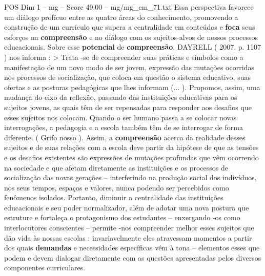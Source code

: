 \begin{textsample}{POS Dim 1 – mg – Score 49.00 – mg/mg\_em\_71.txt}
Essa perspectiva favorece um diálogo profícuo entre as quatro áreas do conhecimento, promovendo a construção de um currículo que supera a centralidade em conteúdos e \textbf{foca} seus esforços na \textbf{compreensão} e no diálogo com os sujeitos-alvos de nossos processos educacionais.
Sobre esse \textbf{potencial} de \textbf{compreensão}, DAYRELL ( 2007, p. 1107 ) nos informa : > Trata -se de compreender suas práticas e símbolos como a manifestação de um novo modo de ser jovem, expressão das mutações ocorridas nos processos de socialização, que coloca em questão o sistema educativo, suas ofertas e as posturas pedagógicas que lhes informam (... ).
Propomos, assim, uma mudança do eixo da reflexão, passando das instituições educativas para os sujeitos jovens, as quais têm de ser repensadas para responder aos desafios que esses sujeitos nos colocam.
Quando o ser humano passa a se colocar novas interrogações, a pedagogia e a escola também têm de se interrogar de forma diferente. ( Grifo nosso ).
Assim, a \textbf{compreensão} acerca da realidade desses sujeitos e de suas relações com a escola deve partir da hipótese de que as tensões e os desafios existentes são expressões de mutações profundas que vêm ocorrendo na sociedade e que afetam diretamente as instituições e os processos de socialização das novas gerações – interferindo na produção social dos indivíduos, nos seus tempos, espaços e valores, nunca podendo ser percebidos como fenômenos isolados.
Portanto, diminuir a centralidade das instituições educacionais e seu poder normalizador, além de adotar uma nova postura que estruture e fortaleça o protagonismo dos estudantes – enxergando -os como interlocutores conscientes – permite -nos compreender melhor esses sujeitos que dão vida às nossas escolas : invariavelmente eles atravessam momentos a partir dos quais \textbf{demandas} e necessidades específicas vêm à tona – elementos esses que podem e devem dialogar diretamente com as questões apresentadas pelos diversos componentes curriculares.

\end{textsample}
